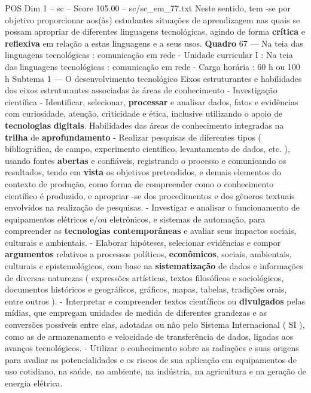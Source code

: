 \begin{textsample}{POS Dim 1 – sc – Score 105.00 – sc/sc\_em\_77.txt}
Neste sentido, tem -se por objetivo proporcionar aos(às) estudantes situações de aprendizagem nas quais se possam apropriar de diferentes linguagens tecnológicas, agindo de forma \textbf{crítica} e \textbf{reflexiva} em relação a estas linguagens e a seus usos. \textbf{Quadro} 67 — Na teia das linguagens tecnológicas : comunicação em rede - Unidade curricular I : Na teia das linguagens tecnológicas : comunicação em rede - Carga horária : 60 h ou 100 h Subtema 1 — O desenvolvimento tecnológico Eixos estruturantes e habilidades dos eixos estruturantes associadas às áreas de conhecimento - Investigação científica - Identificar, selecionar, \textbf{processar} e analisar dados, fatos e evidências com curiosidade, atenção, criticidade e ética, inclusive utilizando o apoio de \textbf{tecnologias} \textbf{digitais}.
Habilidades das áreas de conhecimento integradas na \textbf{trilha} de \textbf{aprofundamento} - Realizar pesquisas de diferentes tipos ( bibliográfica, de campo, experimento científico, levantamento de dados, etc. ), usando fontes \textbf{abertas} e confiáveis, registrando o processo e comunicando os resultados, tendo em \textbf{vista} os objetivos pretendidos, e demais elementos do contexto de produção, como forma de compreender como o conhecimento científico é produzido, e apropriar -se dos procedimentos e dos gêneros textuais envolvidos na realização de pesquisas. - Investigar e analisar o funcionamento de equipamentos elétricos e/ou eletrônicos, e sistemas de automação, para compreender as \textbf{tecnologias} \textbf{contemporâneas} e avaliar seus impactos sociais, culturais e ambientais. - Elaborar hipóteses, selecionar evidências e compor \textbf{argumentos} relativos a processos políticos, \textbf{econômicos}, sociais, ambientais, culturais e epistemológicos, com base na \textbf{sistematização} de dados e informações de diversas naturezas ( expressões artísticas, textos filosóficos e sociológicos, documentos históricos e geográficos, gráficos, mapas, tabelas, tradições orais, entre outros ). - Interpretar e compreender textos científicos ou \textbf{divulgados} pelas mídias, que empregam unidades de medida de diferentes grandezas e as conversões possíveis entre elas, adotadas ou não pelo Sistema Internacional ( SI ), como as de armazenamento e velocidade de transferência de dados, ligadas aos avanços tecnológicos. - Utilizar o conhecimento sobre as radiações e suas origens para avaliar as potencialidades e os riscos de sua aplicação em equipamentos de uso cotidiano, na saúde, no ambiente, na indústria, na agricultura e na geração de energia elétrica.

\end{textsample}
